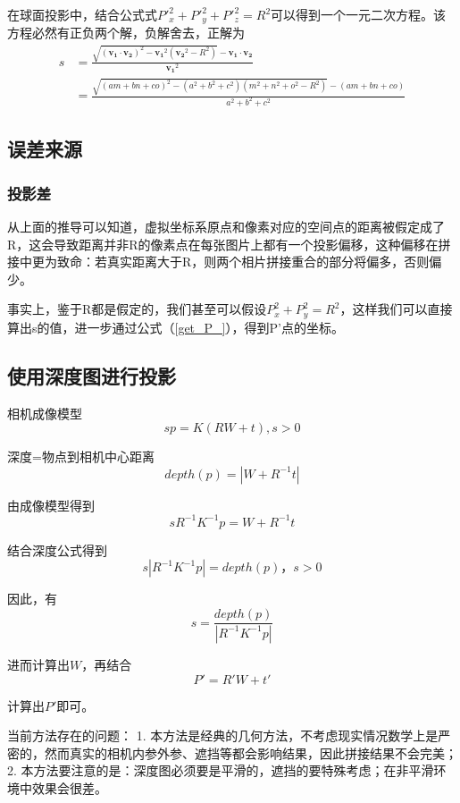 \documentclass{ctexart}
\renewcommand{\vec}[1]{\boldsymbol{#1}} %
\begin{document}
	在球面投影中，结合公式式${P'}_x^2 + {P'}_y^2 + {P'}_z^2 = R^2$可以得到一个一元二次方程。该方程必然有正负两个解，负解舍去，正解为
	\begin{equation}
	\begin{split}
	s
	&= \frac{\sqrt{(\vec{v_1}\cdot\vec{v_2})^2 - \vec{v_1}^2(\vec{v_2}^2-R^2)} - \vec{v_1}\cdot\vec{v_2}}{\vec{v_1}^2} \\
	&=\frac{\sqrt{(a m+b n+c o)^2-(a^2+b^2+c^2) (m^2+n^2+o^2-R^2)}-(am+bn+co)}{a^2+b^2+c^2}
	\end{split}
	\end{equation}
	
	\subsection{误差来源}
	\subsubsection{投影差}
	从上面的推导可以知道，虚拟坐标系原点和像素对应的空间点的距离被假定成了R，这会导致距离并非R的像素点在每张图片上都有一个投影偏移，这种偏移在拼接中更为致命：若真实距离大于R，则两个相片拼接重合的部分将偏多，否则偏少。
	\par
	事实上，鉴于R都是假定的，我们甚至可以假设$P_x^2 + P_y^2 = R^2$，这样我们可以直接算出s的值，进一步通过公式（\ref{get_P_}），得到P'点的坐标。
	
	\subsection{使用深度图进行投影}
	\par 相机成像模型
	\begin{equation}
	s p = K (R W + t) , s>0
	\end{equation}
	\par 深度=物点到相机中心距离
	\begin{equation}
	depth(p) = |W + R^{-1} t|
	\end{equation}
	
	\par 由成像模型得到
	\begin{equation}
	s R^{-1} K^{-1} p = W + R^{-1} t
	\end{equation}
	\par 结合深度公式得到
	\begin{equation}
	s | R^{-1} K^{-1} p | = depth(p)， s>0
	\end{equation}
	\par 因此，有
	\begin{equation}
	s  = \frac{depth(p)}{| R^{-1} K^{-1} p |}
	\end{equation}
	\par 进而计算出$W$，再结合
	\begin{equation}
	P' = R' W + t'
	\end{equation}
	\par 计算出$P'$即可。
	\par 当前方法存在的问题：
	1. 本方法是经典的几何方法，不考虑现实情况数学上是严密的，然而真实的相机内参外参、遮挡等都会影响结果，因此拼接结果不会完美；
	2. 本方法要注意的是：深度图必须要是平滑的，遮挡的要特殊考虑；在非平滑环境中效果会很差。
	
\end{document}
